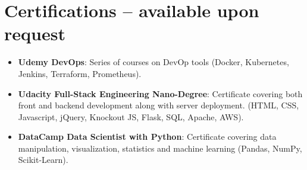 \documentclass[letterpaper,11pt]{article}
\newcommand{\resumeItem}[2]{
  \item\small{
    \textbf{#1}{: #2 \vspace{-2pt}}
  }
}
\newcommand{\resumeSubItem}[2]{\resumeItem{#1}{#2}\vspace{-4pt}}
\newcommand{\resumeSubHeadingListStart}{\begin{itemize}[leftmargin=*]}
\newcommand{\resumeSubHeadingListEnd}{\end{itemize}}
\begin{document}
%
\section{Certifications -- available upon request}
  \resumeSubHeadingListStart
    \resumeSubItem{Udemy DevOps}
      {Series of courses on DevOp tools (Docker, Kubernetes, Jenkins, Terraform, Prometheus).}
    \resumeSubItem{Udacity Full-Stack Engineering Nano-Degree}
      {Certificate covering both front and backend development along with server deployment. (HTML, CSS, Javascript, jQuery, Knockout JS, Flask, SQL, Apache, AWS).}
    \resumeSubItem{DataCamp Data Scientist with Python}
      {Certificate covering data manipulation, visualization, statistics and machine learning (Pandas, NumPy, Scikit-Learn).}
  \resumeSubHeadingListEnd

\end{document}
